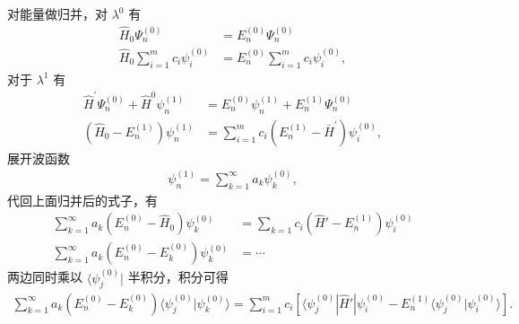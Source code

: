 对能量做归并，对 $\lambda^0$ 有
\begin{align}
    \hat H_0 \Psi_n^{(0)} &= E_n^{(0)} \Psi_n^{(0)} \\
    \hat H_0 \sum_{i=1}^m c_i \psi_i^{(0)} &= E_n^{(0)} \sum_{i=1}^m c_i \psi_i^{(0)},
\end{align}
对于 $\lambda^1$ 有
\begin{align}
    \hat{H}^{\prime} \Psi_n^{(0)}+\hat{H}^0 \psi_n^{(1)}&=E_n^{(0)} \psi_n^{(1)}+E_n^{(1)} \Psi_n^{(0)} \\
    \left(\hat{H}_0-E_n^{(1)}\right) \psi_n^{(1)}&=\sum_{i=1}^m c_i\left(E_n^{(1)}-\bar{H}^{\prime}\right) \psi_i^{(0)},
\end{align}
展开波函数
\begin{align}
    \psi_n^{(1)} = \sum_{k=1}^{\infty} a_k \psi_k^{(0)},
\end{align}
代回上面归并后的式子，有
\begin{align}
    \sum_{k=1}^{\infty} a_k (E_n^{(0)} - \hat H_0) \psi_k^{(0)} &= \sum_{k=1} c_i (\hat H' - E_n^{(1)}) \psi_i^{(0)} \\
    \sum_{k=1}^{\infty} a_k (E_n^{(0)} - E_k^{(0)}) \psi_k^{(0)} &= \cdots
\end{align}
两边同时乘以 $\langle \psi_j^{(0)} |$ 半积分，积分可得
\begin{align}
    \sum_{k=1}^{\infty} a_k (E_n^{(0)} - E_k^{(0)}) \langle \psi_j^{(0)} | \psi_k^{(0)} \rangle = \sum_{i=1}^{m} c_i \left[
        \langle \psi_j^{(0)} | \hat H' | \psi_i^{(0)}
        - E_n^{(1)} \langle \psi_j^{(0)} | \psi_i^{(0)} \rangle
    \right]. 
\end{align}

